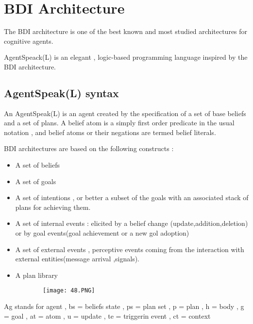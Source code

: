 \documentclass{article}
\begin{document}
\vspace{80mm}

\section{BDI Architecture}

The BDI architecture is one of the best known and most studied architectures for cognitive agents.

AgentSpeack(L) is an elegant , logic-based programming language inspired by the BDI architecture.

\subsection{AgentSpeak(L) syntax}

An AgentSpeak(L) is an agent created by the specification of a set of base beliefs and a set of plans. A belief atom is a simply first order predicate in the usual notation , and belief atoms or their negations are termed belief literals. 

BDI architectures are based on the following constructs :

\begin{itemize}
    \item A set of beliefs
    \item A set of goals 
    \item A set of intentions , or better a subset of the goals with an associated stack of plans for achieving them.
    \item A set of internal events : elicited by a belief change (update,addition,deletion) or by goal events(goal achievement or a new gol adoption)
    \item A set of external events , perceptive events coming from the interaction with external entities(message arrival ,signals).
    \item A plan library
\end{itemize}



\begin{figure}[ht!]
  \centering
  \begin{subfigure}[b]{0.6\linewidth}
    \texttt{[image: 48.PNG]}
  \end{subfigure}
\end{figure}

Ag stands for agent , bs = beliefs state , ps = plan set , p = plan , h = body , g = goal , at = atom , u = update , te = triggerin event , ct = context
\end{document}
